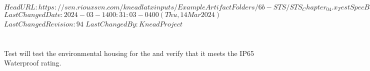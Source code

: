 \svnidlong
{$HeadURL: https://svn.riouxsvn.com/kneadlatxinputs/ExampleArtifactFolders/6b-STS/STS_Chapter_04.x_TestSpecBase.tex $}
{$LastChangedDate: 2024-03-14 00:31:03 -0400 (Thu, 14 Mar 2024) $}
{$LastChangedRevision: 94 $}
{$LastChangedBy: KneadProject $}

\section{\StsTestSpecID}
\label{loc:Test\StsTestSpecID}
% 

Test  will test the environmental housing for the \ThisSystem and verify that it meets the IP65 Waterproof rating.

\renewcommand{\StsTestCaseID}{Waterproof Rating}%



